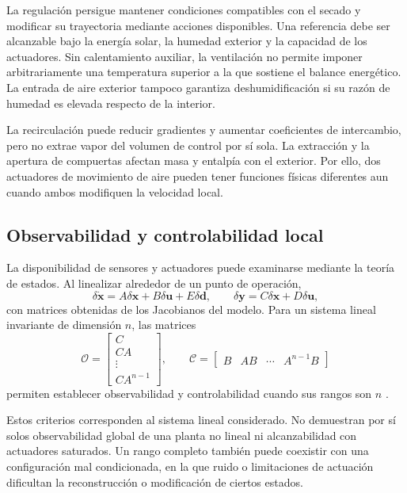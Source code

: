 La regulación persigue mantener condiciones compatibles con el secado y modificar su trayectoria mediante acciones disponibles. Una referencia debe ser alcanzable bajo la energía solar, la humedad exterior y la capacidad de los actuadores. Sin calentamiento auxiliar, la ventilación no permite imponer arbitrariamente una temperatura superior a la que sostiene el balance energético. La entrada de aire exterior tampoco garantiza deshumidificación si su razón de humedad es elevada respecto de la interior.

La recirculación puede reducir gradientes y aumentar coeficientes de intercambio, pero no extrae vapor del volumen de control por sí sola. La extracción y la apertura de compuertas afectan masa y entalpía con el exterior. Por ello, dos actuadores de movimiento de aire pueden tener funciones físicas diferentes aun cuando ambos modifiquen la velocidad local.



\subsection{Observabilidad y controlabilidad local}

La disponibilidad de sensores y actuadores puede examinarse mediante la teoría de estados. Al linealizar alrededor de un punto de operación,
\begin{equation}
\delta\dot{\mathbf x}=A\delta\mathbf x+B\delta\mathbf u+E\delta\mathbf d,
\qquad
\delta\mathbf y=C\delta\mathbf x+D\delta\mathbf u,
\label{eq:linealizacion_control}
\end{equation}
con matrices obtenidas de los Jacobianos del modelo. Para un sistema lineal invariante de dimensión $n$, las matrices
\begin{equation}
\mathcal O=
\begin{bmatrix}C\\CA\\\vdots\\CA^{n-1}\end{bmatrix},
\qquad
\mathcal C=
\begin{bmatrix}B&AB&\cdots&A^{n-1}B\end{bmatrix}
\label{eq:observabilidad_controlabilidad}
\end{equation}
permiten establecer observabilidad y controlabilidad cuando sus rangos son $n$ \cite{astrom2008}.

Estos criterios corresponden al sistema lineal considerado. No demuestran por sí solos observabilidad global de una planta no lineal ni alcanzabilidad con actuadores saturados. Un rango completo también puede coexistir con una configuración mal condicionada, en la que ruido o limitaciones de actuación dificultan la reconstrucción o modificación de ciertos estados.

